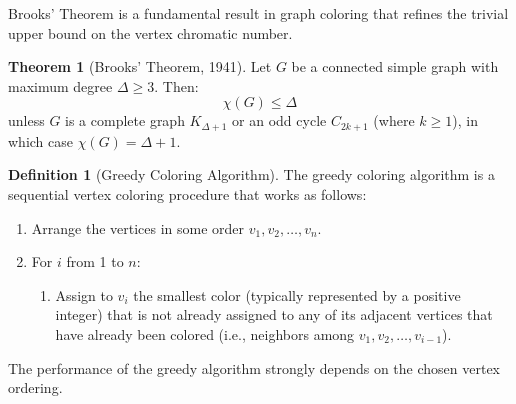 \documentclass{article}
\theoremstyle{definition}
\newtheorem{theorem}{Theorem}
\newtheorem{definition}{Definition}
\begin{document}
Brooks' Theorem is a fundamental result in graph coloring that refines the trivial upper bound on the vertex chromatic number.

\begin{theorem}[Brooks' Theorem, 1941]
Let $G$ be a connected simple graph with maximum degree $\Delta \geq 3$. Then:
\begin{equation}
\chi(G) \leq \Delta
\end{equation}
unless $G$ is a complete graph $K_{\Delta+1}$ or an odd cycle $C_{2k+1}$ (where $k \geq 1$), in which case $\chi(G) = \Delta + 1$.
\end{theorem}

\begin{definition}[Greedy Coloring Algorithm]
The greedy coloring algorithm is a sequential vertex coloring procedure that works as follows:
\begin{enumerate}
    \item Arrange the vertices in some order $v_1, v_2, \ldots, v_n$.
    \item For $i$ from 1 to $n$:
    \begin{enumerate}
        \item Assign to $v_i$ the smallest color (typically represented by a positive integer) that is not already assigned to any of its adjacent vertices that have already been colored (i.e., neighbors among $v_1, v_2, \ldots, v_{i-1}$).
    \end{enumerate}
\end{enumerate}
The performance of the greedy algorithm strongly depends on the chosen vertex ordering.
\end{definition}
\end{document}
